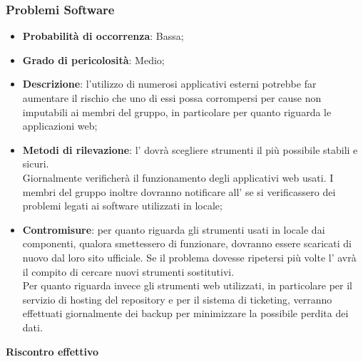 		
		\subsubsection{Problemi Software} %
		\label{ssub:problemi_software}
			\begin{itemize}
				\item \textbf{Probabilità di occorrenza}: Bassa;
				\item \textbf{Grado di pericolosità}: Medio;
				\item \textbf{Descrizione}: l'utilizzo di numerosi applicativi esterni potrebbe far aumentare il rischio che uno di essi possa corrompersi per cause non imputabili ai membri del gruppo, in particolare per quanto riguarda le applicazioni web;
				\item \textbf{Metodi di rilevazione}: l'\roleAdministrator{} dovrà scegliere strumenti il più possibile stabili e sicuri. \\
				Giornalmente verificherà il funzionamento degli applicativi web usati. I membri del gruppo inoltre dovranno notificare all'\roleAdministrator{} se si verificassero dei problemi legati ai software utilizzati in locale;
				\item \textbf{Contromisure}: per quanto riguarda gli strumenti usati in locale dai componenti, qualora smettessero di funzionare, dovranno essere scaricati di nuovo dal loro sito ufficiale. Se il problema dovesse ripetersi più volte l'\roleAdministrator{} avrà il compito di cercare nuovi strumenti sostitutivi. \\
				Per quanto riguarda invece gli strumenti web utilizzati, in particolare per il servizio di hosting del repository e per il sistema di ticketing, verranno effettuati giornalmente dei backup per minimizzare la possibile perdita dei dati.
			\end{itemize}
		\noindent
		\textbf{Riscontro effettivo}
